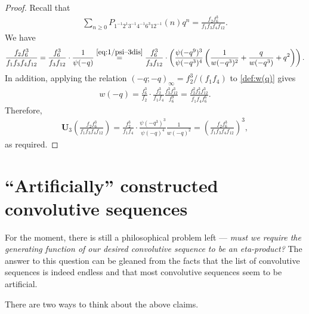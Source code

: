 \documentclass[12pt,reqno]{amsart}
\numberwithin{equation}{section}
\theoremstyle{plain}
\theoremstyle{definition}
\theoremstyle{named}
\newcommand{\UU}{\mathbf{U}}
\begin{document}
\begin{proof}
	Recall that
	\begin{align*}
		\sum_{n\ge 0} P_{1^{-1} 2^1 3^{-1} 4^{-1} 6^3 12^{-1}}(n) q^n = \frac{f_2 f_6^3}{f_1 f_3 f_4 f_{12}}.
	\end{align*}
	We have
	\begin{align*}
		\frac{f_2 f_6^3}{f_1 f_3 f_4 f_{12}} = \frac{f_6^3}{f_3 f_{12}}\cdot \frac{1}{\psi(-q)} \overset{\eqref{eq:1/psi--3dis}}{=} \frac{f_6^3}{f_3 f_{12}}\cdot \left(\frac{\psi(-q^9)^3}{\psi(-q^3)^4}\left(\frac{1}{w(-q^3)^2}+\frac{q}{w(-q^3)}+q^2\right)\right).
	\end{align*}
	In addition, applying the relation $(-q;-q)_{\infty}=f_2^3/(f_1f_4)$ to \eqref{def:w(q)} gives
	\begin{align*}
		w(-q) = \frac{f_6^3}{f_2}\cdot \frac{f_2^3}{f_1f_4}\frac{f_3^3f_{12}^3}{f_6^9} = \frac{f_2^2 f_3^3 f_{12}^3}{f_1 f_4 f_6^6}.
	\end{align*}
	Therefore,
	\begin{align*}
		\UU_3\left(\frac{f_2 f_6^3}{f_1 f_3 f_4 f_{12}}\right) = \frac{f_2^3}{f_1 f_{4}}\cdot \frac{\psi(-q^3)^3}{\psi(-q)^4}\frac{1}{w(-q)^2} = \left(\frac{f_2 f_6^3}{f_1 f_3 f_4 f_{12}}\right)^3,
	\end{align*}
	as required.
\end{proof}



\section{``Artificially'' constructed convolutive sequences }\label{sec:artificial}

For the moment, there is still a philosophical problem left --- \textit{must we require the generating function of our desired convolutive sequence to be an eta-product?} The answer to this question can be gleaned from the facts that the list of convolutive sequences is indeed endless and that most convolutive sequences seem to be artificial. 

There are two ways to think about the above claims.
\end{document}
